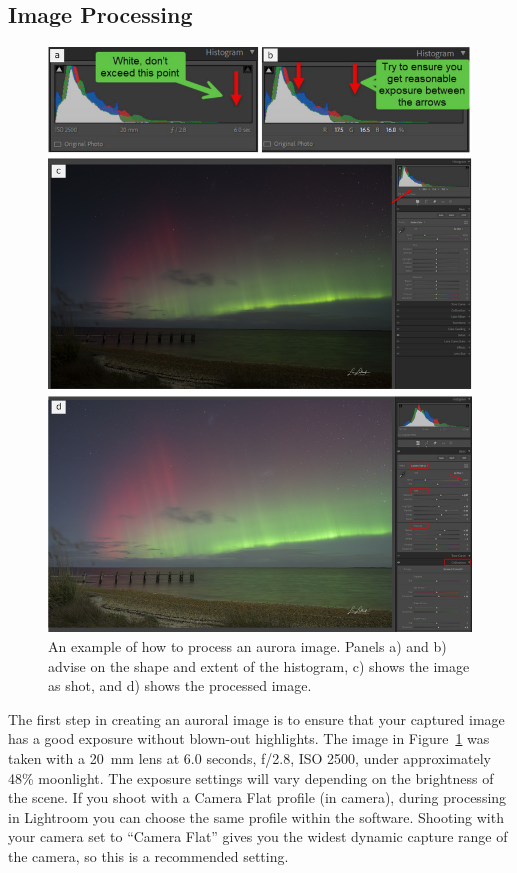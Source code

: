 \documentclass{article}
\newcommand{\contributed}[1]{%
    \par\noindent
    \begingroup
    \setlength{\leftskip}{1em}%
    \itshape
    Contributors: #1
    \par
    \endgroup
    \vspace{0.5em}
}
\begin{document}
\subsection{Image Processing}

\begin{figure}
  \includegraphics[width=\linewidth]{Fig13_ImageHistograms.png}
  \caption{An example of how to process an aurora image. Panels a) and b) advise on the shape and extent of the histogram, c) shows the image as shot, and d) shows the processed image.}
  \label{Processing}
\end{figure}

The first step in creating an auroral image is to ensure that your captured image has a good exposure without blown-out highlights. The image in Figure~\ref{Processing} was taken with a 20~mm lens at 6.0 seconds, f/2.8, ISO 2500, under approximately 48\% moonlight. The exposure settings will vary depending on the brightness of the scene. If you shoot with a Camera Flat profile (in camera), during processing in Lightroom you can choose the same profile within the software.  Shooting with your camera set to ``Camera Flat'' gives you the widest dynamic capture range of the camera, so this is a recommended setting. 
\end{document}
